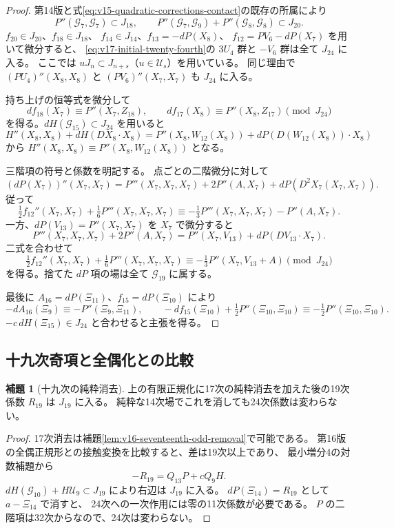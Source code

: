 \documentclass[a4paper,11pt]{ltjsarticle}
\theoremstyle{definition}
\newtheorem{lemma}[theorem]{補題}
\begin{document}
\begin{proof}
第14版と式\eqref{eq:v15-quadratic-corrections-contact}の既存の所属により
\[
 P''(\mathcal G_7,\mathcal G_7)\subset J_{18},\qquad
 P''(\mathcal G_7,\mathcal G_9)+P''(\mathcal G_8,\mathcal G_8)\subset J_{20}.
\]
$f_{20}\in J_{20}$、$f_{18}\in J_{18}$、
$f_{14}\in J_{14}$、$f_{13}=-dP(X_8)$、
$f_{12}=PV_6-dP(X_7)$ を用いて微分すると、
\eqref{eq:v17-initial-twenty-fourth}の $3U_4$ 群と $-V_6$ 群は全て $J_{24}$ に入る。
ここでは $uJ_n\subset J_{n+s}$（$u\in\mathcal U_s$）を用いている。
同じ理由で $(PU_4)''(X_8,X_8)$ と $(PV_6)''(X_7,X_7)$ も $J_{24}$ に入る。

持ち上げの恒等式を微分して
\[
 df_{18}(X_7)\equiv P''(X_7,Z_{18}),\qquad
 df_{17}(X_8)\equiv P''(X_8,Z_{17})\pmod{J_{24}}
\]
を得る。$dH(\mathcal G_{15})\subset J_{24}$ を用いると
\[
 H''(X_8,X_8)+dH(DX_8\cdot X_8)
   =P''(X_8,W_{12}(X_8))+dP(D(W_{12}(X_8))\cdot X_8)
\]
から $H''(X_8,X_8)\equiv P''(X_8,W_{12}(X_8))$ となる。

三階項の符号と係数を明記する。
点ごとの二階微分に対して
\[
 (dP(X_7))''(X_7,X_7)
  =P'''(X_7,X_7,X_7)+2P''(A,X_7)+dP(D^2X_7(X_7,X_7)).
\]
従って
\[
 \tfrac12f_{12}''(X_7,X_7)+\tfrac16P'''(X_7,X_7,X_7)
 \equiv-\tfrac13P'''(X_7,X_7,X_7)-P''(A,X_7).
\]
一方、$dP(V_{13})=P''(X_7,X_7)$ を $X_7$ で微分すると
\[
 P'''(X_7,X_7,X_7)+2P''(A,X_7)
 =P''(X_7,V_{13})+dP(DV_{13}\cdot X_7).
\]
二式を合わせて
\[
 \tfrac12f_{12}''(X_7,X_7)+\tfrac16P'''(X_7,X_7,X_7)
 \equiv-\tfrac13P''(X_7,V_{13}+A)\pmod{J_{24}}
\]
を得る。捨てた $dP$ 項の場は全て $\mathcal G_{19}$ に属する。

最後に $A_{16}=dP(\Xi_{11})$、$f_{15}=dP(\Xi_{10})$ により
\[
 -dA_{16}(\Xi_9)\equiv-P''(\Xi_9,\Xi_{11}),\qquad
 -df_{15}(\Xi_{10})+\tfrac12P''(\Xi_{10},\Xi_{10})
       \equiv-\tfrac12P''(\Xi_{10},\Xi_{10}).
\]
$-c\,dH(\Xi_{15})\in J_{24}$ と合わせると主張を得る。
\end{proof}

\subsection{十九次奇項と全偶化との比較}

\begin{lemma}[十九次の純粋消去]
\label{lem:v17-nineteenth-odd-removal}
上の有限正規化に17次の純粋消去を加えた後の19次係数 $R_{19}$ は $J_{19}$ に入る。
純粋な14次場でこれを消しても24次係数は変わらない。
\end{lemma}

\begin{proof}
17次消去は補題\ref{lem:v16-seventeenth-odd-removal}で可能である。
第16版の全偶正規形との接触変換を比較すると、差は19次以上であり、
最小増分4の対数補題から
\[
                        -R_{19}=Q_{13}P+cQ_9H.
\]
$dH(\mathcal G_{10})+H\mathcal U_9\subset J_{19}$ により右辺は $J_{19}$ に入る。
$dP(\Xi_{14})=R_{19}$ として $a-\Xi_{14}$ で消すと、
24次への一次作用には零の11次係数が必要である。
$P$ の二階項は32次からなので、24次は変わらない。
\end{proof}
\end{document}
